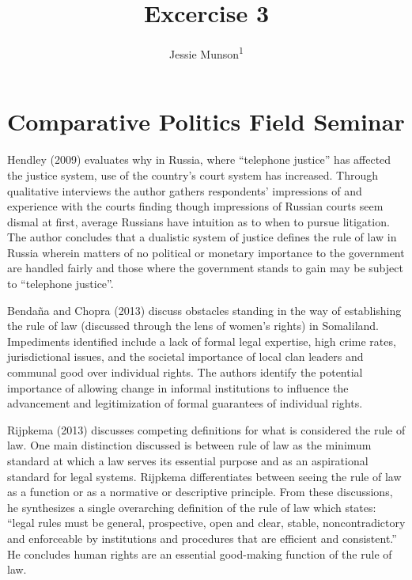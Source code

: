 \documentclass[
  english,
  man]{apa6}
\title{Excercise 3}
\author{Jessie Munson\textsuperscript{1}}
\date{}
\affiliation{\vspace{0.5cm}\textsuperscript{1} University of Wisconsin - Madison\\\textsuperscript{2} Department of Political Science}
\begin{document}
\maketitle

\hypertarget{comparative-politics-field-seminar}{%
\section{Comparative Politics Field Seminar}\label{comparative-politics-field-seminar}}

Hendley (2009) evaluates why in Russia, where \enquote{telephone justice} has affected the justice system, use of the country's court system has increased. Through qualitative interviews the author gathers respondents' impressions of and experience with the courts finding though impressions of Russian courts seem dismal at first, average Russians have intuition as to when to pursue litigation. The author concludes that a dualistic system of justice defines the rule of law in Russia wherein matters of no political or monetary importance to the government are handled fairly and those where the government stands to gain may be subject to \enquote{telephone justice}.

Bendaña and Chopra (2013) discuss obstacles standing in the way of establishing the rule of law (discussed through the lens of women's rights) in Somaliland. Impediments identified include a lack of formal legal expertise, high crime rates, jurisdictional issues, and the societal importance of local clan leaders and communal good over individual rights. The authors identify the potential importance of allowing change in informal institutions to influence the advancement and legitimization of formal guarantees of individual rights.

Rijpkema (2013) discusses competing definitions for what is considered the rule of law. One main distinction discussed is between rule of law as the minimum standard at which a law serves its essential purpose and as an aspirational standard for legal systems. Rijpkema differentiates between seeing the rule of law as a function or as a normative or descriptive principle. From these discussions, he synthesizes a single overarching definition of the rule of law which states: \enquote{legal rules must be general, prospective, open and clear, stable, noncontradictory and enforceable by institutions and procedures that are efficient and consistent.} He concludes human rights are an essential good-making function of the rule of law.
\end{document}
